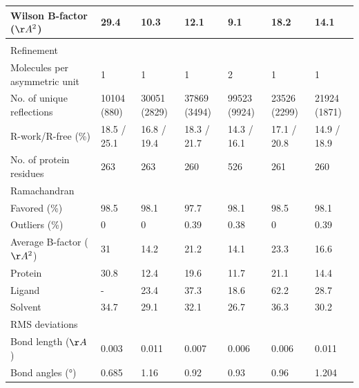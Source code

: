 \documentclass[../main.tex]{subfiles}
\begin{document}
\begin{table}[]
{\begin{tabular}{|l|l|l|l|l|l|l|}
    Wilson B-factor ($\AA{}^2$)          & 29.4        & 10.3        & 12.1         & 9.1          & 18.2         & 14.1         \\ \hline
                                  &             &             &              &              &              &              \\ \hline
    Refinement                    &             &             &              &              &              &              \\ \hline
    Molecules per asymmetric unit & 1           & 1           & 1            & 2            & 1            & 1            \\ \hline
    No. of unique reflections & 10104 (880)       & 30051 (2829)      & 37869 (3494)      & 99523 (9924)      & 23526 (2299)      & 21924 (1871)      \\ \hline
    R-work/R-free (\%)        & 18.5 / 25.1       & 16.8 / 19.4       & 18.3 / 21.7       & 14.3 / 16.1       & 17.1 / 20.8       & 14.9 / 18.9       \\ \hline
    No. of protein residues       & 263         & 263         & 260          & 526          & 261          & 260          \\ \hline
    Ramachandran                  &             &             &              &              &              &              \\ \hline
    Favored (\%)                  & 98.5        & 98.1        & 97.7         & 98.1         & 98.5         & 98.1         \\ \hline
    Outliers (\%)                 & 0           & 0           & 0.39         & 0.38         & 0            & 0.39         \\ \hline
    Average B-factor ($\AA{}^2$)         & 31          & 14.2        & 21.2         & 14.1         & 23.3         & 16.6         \\ \hline
    Protein                       & 30.8        & 12.4        & 19.6         & 11.7         & 21.1         & 14.4         \\ \hline
    Ligand                        & -           & 23.4        & 37.3         & 18.6         & 62.2         & 28.7         \\ \hline
    Solvent                       & 34.7        & 29.1        & 32.1         & 26.7         & 36.3         & 30.2         \\ \hline
    RMS deviations                &             &             &              &              &              &              \\ \hline
    Bond length ($\AA{}$)               & 0.003       & 0.011       & 0.007        & 0.006        & 0.006        & 0.011        \\ \hline
    Bond angles (°)               & 0.685       & 1.16        & 0.92         & 0.93         & 0.96         & 1.204        \\ \hline
    \end{tabular}}
    \end{table}
\end{document}
